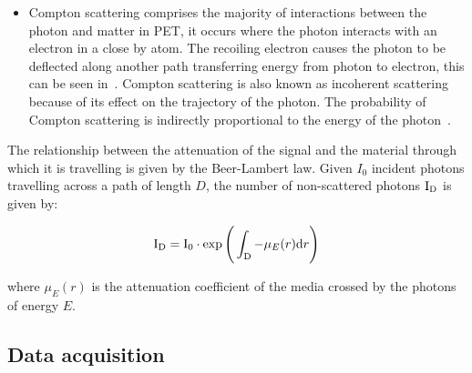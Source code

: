 \begin{itemize}
                    \item Compton scattering comprises the majority of interactions between the photon and matter in \gls{PET}, it occurs where the photon interacts with an electron in a close by atom. The recoiling electron causes the photon to be deflected along another path transferring energy from photon to electron, this can be seen in~. Compton scattering is also known as incoherent scattering because of its effect on the trajectory of the photon. The probability of Compton scattering is indirectly proportional to the energy of the photon~.
                \end{itemize}
                
                The relationship between the attenuation of the signal and the material through which it is travelling is given by the Beer-Lambert law. Given $I_0$ incident photons travelling across a path of length $D$, the number of non-scattered photons $\mathrm{I}_{\mathrm{D}}$ is given by: %
                 
                \begin{equation} \label{sec:eq:beer_lambert_law}
                    \rmI_{\rmD} = \rmI_{0} \cdot \exp\Bigg(\int_{\rmD} - \mu_E(r)\rmd r \Bigg) %
                \end{equation}

                \noindent where $\mu_E(r)$ is the attenuation coefficient of the media crossed by the photons of energy $E$.
        
        \subsection{Data acquisition} \label{sec:data_acquisition}
            
